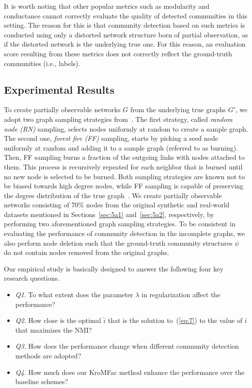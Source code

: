 \documentclass[format=acmsmall, review=false, screen=true]{acmart}
\begin{document}
It is worth noting that other popular metrics such as modularity \cite{newman2006modularity} and conductance \cite{leung2009towards} cannot correctly evaluate the quality of detected communities in this setting. The reason for this is that community detection based on such metrics is conducted using only a distorted network structure born of partial observation, as if the distorted network is the underlying true one. For this reason, an evaluation score resulting from these metrics does not correctly reflect the ground-truth communities (i.e., labels).


\subsection{Experimental Results}\label{sec:5c}

To create partially observable networks $G$ from the underlying true graphs $G'$, we adopt two graph sampling strategies from~\cite{graphsampling}. The first strategy, called {\em random node (RN)} sampling, selects nodes uniformly at random to create a sample graph. The second one, {\em forest fire (FF)} sampling, starts by picking a seed node uniformly at random and adding it to a sample graph (referred to as burning). Then, FF sampling burns a fraction of the outgoing links with nodes attached to them. This process is recursively repeated for each neighbor that is burned until no new node is selected to be burned. Both sampling strategies are known not to be biased towards high degree nodes, while FF sampling is capable of preserving the degree distribution of the true graph~\cite{graphsampling}. 
We create partially observable networks consisting of 70\% nodes from the original synthetic and real-world datasets mentioned in Sections~\ref{sec:5a1} and~\ref{sec:5a2}, respectively, by performing two aforementioned graph sampling strategies. To be consistent in evaluating the performance of community detection in the incomplete graphs, we also perform node deletion such that the ground-truth community structures $\psi$ do not contain nodes removed from the original graphs. 

Our empirical study is basically designed to answer the following four key research questions.
\begin{itemize}
\item {\em Q1}. To what extent does the parameter $\lambda$ in regularization affect the performance?
\item {\em Q2}. How close is the optimal $\hat{i}$ that is the solution to~(\ref{eq:7}) to the value of $i$ that maximizes the NMI? 
\item {\em Q3}. How does the performance change when different community detection methods are adopted?
\item {\em Q4}. How much does our \textsf{KroMFac} method enhance the performance over the baseline schemes?
\end{itemize}
\end{document}
